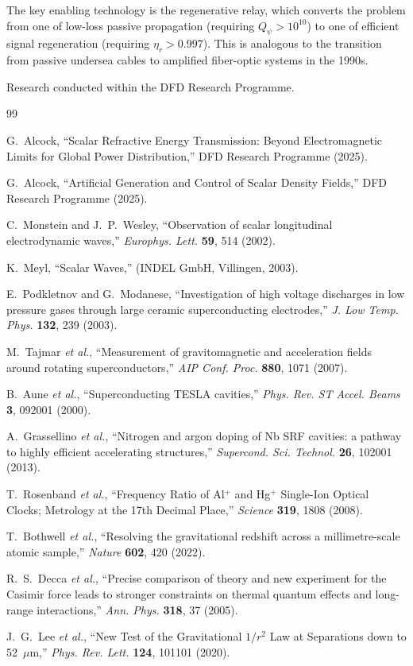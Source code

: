 \documentclass[twocolumn,superscriptaddress,prd]{revtex4-2}
\newcommand{\etal}{\textit{et al.}}
\begin{document}
The key enabling technology is the regenerative relay, which
converts the problem from one of low-loss passive propagation
(requiring $Q_\psi > 10^{10}$) to one of efficient signal
regeneration (requiring $\eta_r > 0.997$).  This is analogous
to the transition from passive undersea cables to amplified
fiber-optic systems in the 1990s.

\begin{acknowledgments}
Research conducted within the DFD Research Programme.
\end{acknowledgments}

\begin{thebibliography}{99}

G.~Alcock, ``Scalar Refractive Energy Transmission:
Beyond Electromagnetic Limits for Global Power Distribution,''
DFD Research Programme (2025).

G.~Alcock, ``Artificial Generation and Control of Scalar
Density Fields,'' DFD Research Programme (2025).

C.~Monstein and J.~P.~Wesley, ``Observation of scalar longitudinal
electrodynamic waves,'' \textit{Europhys. Lett.} \textbf{59}, 514 (2002).

K.~Meyl, ``Scalar Waves,'' (INDEL GmbH, Villingen, 2003).

E.~Podkletnov and G.~Modanese, ``Investigation of high voltage
discharges in low pressure gases through large ceramic
superconducting electrodes,'' \textit{J. Low Temp. Phys.}
\textbf{132}, 239 (2003).

M.~Tajmar \etal, ``Measurement of gravitomagnetic and acceleration
fields around rotating superconductors,'' \textit{AIP Conf. Proc.}
\textbf{880}, 1071 (2007).

B.~Aune \etal, ``Superconducting TESLA cavities,''
\textit{Phys. Rev. ST Accel. Beams} \textbf{3}, 092001 (2000).

A.~Grassellino \etal, ``Nitrogen and argon doping of Nb SRF
cavities: a pathway to highly efficient accelerating
structures,'' \textit{Supercond. Sci. Technol.} \textbf{26},
102001 (2013).

T.~Rosenband \etal, ``Frequency Ratio of Al$^+$ and Hg$^+$
Single-Ion Optical Clocks; Metrology at the 17th Decimal
Place,'' \textit{Science} \textbf{319}, 1808 (2008).

T.~Bothwell \etal, ``Resolving the gravitational redshift across
a millimetre-scale atomic sample,'' \textit{Nature} \textbf{602},
420 (2022).

R.~S.~Decca \etal, ``Precise comparison of theory and new
experiment for the Casimir force leads to stronger constraints
on thermal quantum effects and long-range interactions,''
\textit{Ann. Phys.} \textbf{318}, 37 (2005).

J.~G.~Lee \etal, ``New Test of the Gravitational $1/r^2$ Law
at Separations down to 52~$\mu$m,'' \textit{Phys. Rev. Lett.}
\textbf{124}, 101101 (2020).

\end{thebibliography}
\end{document}
